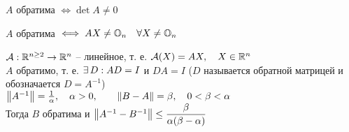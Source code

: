 \begin{remind}
	$ A $ обратима $ \iff \det A \ne 0 $
\end{remind}

\begin{remind}
	$ A $ обратима $ \iff AX \ne \mathbb{O}_{n} \quad \forall X \ne \mathbb{O}_{n} $
\end{remind}

\begin{theorem}
	$ \mathcal{A} : \mathbb{R}^{n \ge 2} \to \mathbb{R}^n $ -- линейное, т. е. $ \mathcal{A}(X) = AX, \quad X \in \mathbb{R}^n $ \\
	$ A $ обратимо, т. е. $ \exists\, D : AD = I $ и $ DA = I $ ($ D $ называется обратной матрицей и обозначается $ D = A^{-1} $) \\
	$ \left\|{A^{-1}}\right\| = \frac1\alpha, \quad \alpha > 0, \qquad \left\|{B - A}\right\| = \beta, \quad 0 < \beta < \alpha $ \\
	Тогда $ B $ обратима и $ \left\|{A^{-1} - B^{-1}}\right\| \le \dfrac{\beta}{\alpha(\beta - \alpha)} $
\end{theorem}

